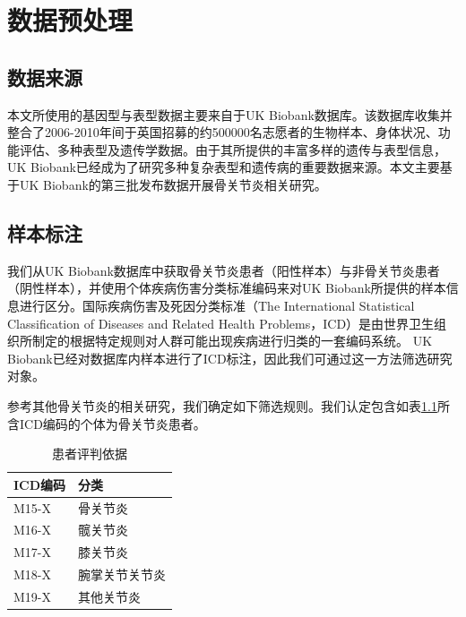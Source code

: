 \chapter{数据预处理}
\section{数据来源}

本文所使用的基因型与表型数据主要来自于UK Biobank\cite{sudlow_uk_2015}数据库。该数据库收集并整合了2006-2010年间于英国招募的约500000名志愿者的生物样本、身体状况、功能评估、多种表型及遗传学数据。由于其所提供的丰富多样的遗传与表型信息，UK Biobank已经成为了研究多种复杂表型和遗传病的重要数据来源。本文主要基于UK Biobank的第三批发布数据开展骨关节炎相关研究。

\section{样本标注}

我们从UK Biobank数据库中获取骨关节炎患者（阳性样本）与非骨关节炎患者（阴性样本），并使用个体疾病伤害分类标准编码来对UK Biobank所提供的样本信息进行区分。国际疾病伤害及死因分类标准（The International Statistical Classification of Diseases and Related Health Problems，ICD）是由世界卫生组织所制定的根据特定规则对人群可能出现疾病进行归类的一套编码系统。\cite{who} UK Biobank已经对数据库内样本进行了ICD标注，因此我们可通过这一方法筛选研究对象。

参考其他骨关节炎的相关研究，\cite{zengini_genome-wide_2018}我们确定如下筛选规则。我们认定包含如表\ref{ICD_include}所含ICD编码的个体为骨关节炎患者。


\begin{table}[!h]
	\renewcommand{\arraystretch}{1.2}
	\centering\wuhao
	\caption{患者评判依据} \label{ICD_include} \vspace{2mm}
	\begin{tabularx}{\textwidth} { 
   >{\centering\arraybackslash}X 
   >{\centering\arraybackslash}X  }
	\toprule[1.5pt]
		ICD编码 & 分类 \\
	\midrule[1pt]
		M15-X & 骨关节炎 \\
        M16-X & 髋关节炎 \\
        M17-X & 膝关节炎 \\
        M18-X & 腕掌关节关节炎 \\
        M19-X & 其他关节炎 \\
	\bottomrule[1.5pt]
	\end{tabularx}
\end{table}

